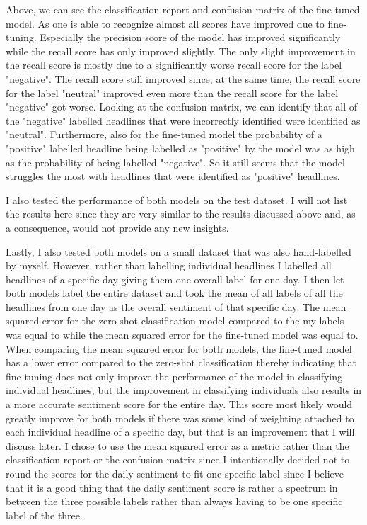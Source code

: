 \documentclass[11pt, a4paper, leqno]{article}
\begin{document}






Above, we can see the classification report and confusion matrix of the fine-tuned model. As one is able to recognize almost all scores have improved due to fine-tuning. Especially the precision score of the model has improved significantly while the recall score has only improved slightly. The only slight improvement in the recall score is mostly due to a significantly worse recall score for the label "negative". The recall score still improved since, at the same time, the recall score for the label "neutral" improved even more than the recall score for the label "negative" got worse.
Looking at the confusion matrix, we can identify that all of the "negative" labelled headlines that were incorrectly identified were identified as "neutral". Furthermore, also for the fine-tuned model the probability of a "positive" labelled headline being labelled as "positive" by the model was as high as the probability of being labelled "negative". So it still seems that the model struggles the most with headlines that were identified as "positive" headlines.

I also tested the performance of both models on the test dataset. I will not list the results here since they are very similar to the results discussed above and, as a consequence, would not provide any new insights.

Lastly, I also tested both models on a small dataset that was also hand-labelled by myself. However, rather than labelling individual headlines I labelled all headlines of a specific day giving them one overall label for one day. I then let both models label the entire dataset and took the mean of all labels of all the headlines from one day as the overall sentiment of that specific day.
The mean squared error for the zero-shot classification model compared to the my labels was equal to while the mean squared error for the fine-tuned model was equal to. When comparing the mean squared error for both models, the fine-tuned model has a lower error compared to the zero-shot classification thereby indicating that fine-tuning does not only improve the performance of the model in classifying individual headlines, but the improvement in classifying individuals also results in a more accurate sentiment score for the entire day. This score most likely would greatly improve for both models if there was some kind of weighting attached to each individual headline of a specific day, but that is an improvement that I will discuss later.
I chose to use the mean squared error as a metric rather than the classification report or the confusion matrix since I intentionally decided not to round the scores for the daily sentiment to fit one specific label since I believe that it is a good thing that the daily sentiment score is rather a spectrum in between the three possible labels rather than always having to be one specific label of the three. 
\end{document}
